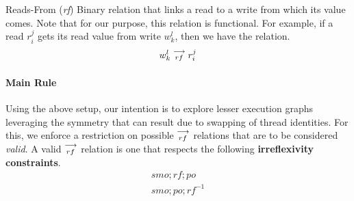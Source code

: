     \begin{definition}{Reads-From (\emph{rf})}
        \label{ReadF}
        Binary relation that links a read to a write from which its value comes. Note that for our purpose, this relation is functional.
        For example, if a read $r_i^j$ gets its read value from write $w_k^l$, then we have the relation. 
        \begin{align*}
            w_k^l\stackrel{\longrightarrow}{_{rf}}r_i^j
        \end{align*}
    \end{definition}

    \paragraph{Main Rule}
        Using the above setup, our intention is to explore lesser execution graphs leveraging the symmetry that can result due to swapping of thread identities. For this, we enforce a restriction on possible $\stackrel{\longrightarrow}{_{rf}}$ relations that are to be considered \emph{valid}. A valid $\stackrel{\longrightarrow}{_{rf}}$ relation is one that respects the following \textbf{irreflexivity constraints}. 
        \begin{align*}
            smo;rf;po \\
            smo;po;rf^{-1} 
        \end{align*}




        

